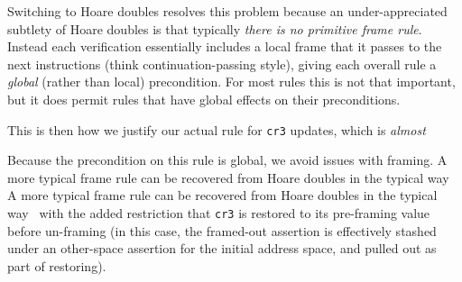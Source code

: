 Switching to Hoare doubles resolves this problem because an under-appreciated subtlety of Hoare doubles 
is that typically \emph{there is no primitive frame rule}. 
Instead each verification essentially includes a local frame that it passes to the next instructions
(think continuation-passing style), giving each overall rule a \emph{global} (rather than local) precondition. For most rules this is not that important, but it does permit rules that have global effects on their preconditions.

This is then how we justify our actual rule for \lstinline|cr3| updates, which is \emph{almost}
\begin{mathpar}
\end{mathpar}
Because the precondition on this rule is global, we avoid issues with framing. A more typical frame rule can be recovered from Hoare doubles in the typical way~\cite{Chlipala2013Bedrock} A more typical frame rule can be recovered from Hoare doubles in the typical way~\cite{Chlipala2013Bedrock}
with the added restriction that \lstinline|cr3| is restored to its pre-framing value before un-framing (in this case, the framed-out assertion is effectively
stashed under an other-space assertion for the initial address space, and pulled out as part of restoring).





